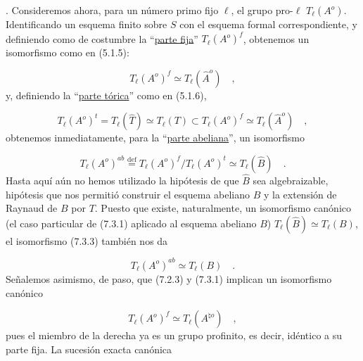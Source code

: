 
\medskip
{}. Consideremos ahora, para un número primo fijo $\ell$, el grupo
pro-$\ell$ $T_{\ell}(A^{o})$. Identificando un esquema finito sobre $S$
con el esquema formal correspondiente, y definiendo como de costumbre
la ``\underline{parte fija}'' $T_{\ell}(A^{o})^{f}$, obtenemos un
isomorfismo como en (5.1.5):


\begin{equation}\tag{7.3.1}
T_{\ell}(A^{o})^{f} \simeq T_{\ell}(\widehat{A}^{o}) \quad ,
\end{equation}
y, definiendo la ``\underline{parte tórica}'' como en (5.1.6),

\begin{equation}\tag{7.3.2}
T_{\ell}(A^{o})^{t} = T_{\ell}(\widehat{T}) \simeq T_{\ell}(T)
 \subset T_{\ell}(A^{o})^{f} \simeq T_{\ell}(\widehat{A}^{o}) \quad ,
\end{equation}
obtenemos inmediatamente, para la ``\underline{parte abeliana}'', un
isomorfismo

\begin{equation}\tag{7.3.3}
T_{\ell}(A^{o})^{ab} \stackrel{\mathrm{def}}{=}
T_{\ell}(A^{o})^{f}/T_{\ell}(A^{o})^{t}
 \simeq T_{\ell}(\widehat{B}) \quad .
\end{equation}
Hasta aquí aún no hemos utilizado la hipótesis de que $\widehat B$ sea
algebraizable, hipótesis que nos permitió construir el esquema abeliano
$B$ y la extensión de Raynaud de $B$ por $T$. Puesto que existe,
naturalmente, un isomorfismo canónico (el caso particular de (7.3.1)
aplicado al esquema abeliano $B$)
$T_{\ell}(\widehat B)\simeq T_{\ell}(B)$, el isomorfismo (7.3.3) también
nos da

\begin{equation}\tag{7.3.4}
T_{\ell}(A^{o})^{ab} \simeq T_{\ell}(B) \quad .
\end{equation}
Señalemos asimismo, de paso, que (7.2.3) y (7.3.1) implican un
isomorfismo canónico

\begin{equation}\tag{7.3.5}
T_{\ell}(A^{o})^{f} \simeq T_{\ell}(A^{\natural o}) \quad ,
\end{equation}
pues el miembro de la derecha ya es un grupo profinito, es decir,
idéntico a su parte fija. La sucesión exacta canónica

